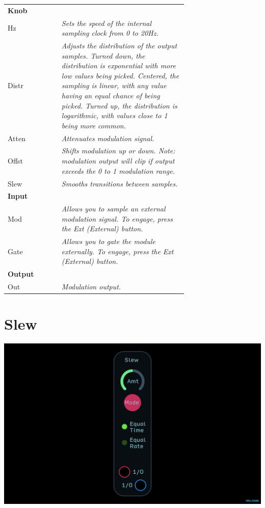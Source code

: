 \documentclass[11pt]{book}
\begin{document}
\begin{table}[ht]
\small
\sffamily
\renewcommand\arraystretch{1.5}
\centering
\begin{tabular}{l*{1}{>{\raggedright\arraybackslash}p{0.7\linewidth}}}

\toprule
\textbf{Knob} \\
Hz & \textit{Sets the speed of the internal sampling clock from 0 to 20Hz.} \\
Distr & \textit{Adjusts the distribution of the output samples. Turned down, the distribution is exponential with more low values being picked. Centered, the sampling is linear, with any value having an equal chance of being picked. Turned up, the distribution is logarithmic, with values close to 1 being more common.} \\
Atten & \textit{Attenuates modulation signal.} \\
Offst & \textit{Shifts modulation up or down. Note: modulation output will clip if output exceeds the 0 to 1 modulation range.} \\
Slew & \textit{Smooths transitions between samples.} \\

\midrule
\textbf{Input} \\
Mod & \textit{Allows you to sample an external modulation signal. To engage, press the Ext (External) button.} \\
Gate & \textit{Allows you to gate the module externally. To engage, press the Ext (External) button.} \\

\midrule
\textbf{Output} \\
Out & \textit{Modulation output.} \\

\bottomrule
\end{tabular}
\end{table}%

\pagebreak


\section{Slew}

\includegraphics[width=\textwidth]{slew.png}
\end{document}

